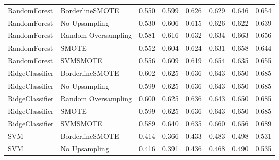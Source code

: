 \begin{tabular}{llllllll}
                RandomForest &     BorderlineSMOTE & 0.550 &                     0.599 &                 0.626 &                  0.629 &                                   0.646 &     0.654 \\
                RandomForest &       No Upsampling & 0.530 &                     0.606 &                 0.615 &                  0.626 &                                   0.622 &     0.639 \\
                RandomForest & Random Oversampling & 0.581 &                     0.616 &                 0.632 &                  0.634 &                                   0.663 &     0.656 \\
                RandomForest &               SMOTE & 0.552 &                     0.604 &                 0.624 &                  0.631 &                                   0.658 &     0.644 \\
                RandomForest &            SVMSMOTE & 0.556 &                     0.609 &                 0.619 &                  0.654 &                                   0.635 &     0.655 \\
             RidgeClassifier &     BorderlineSMOTE & 0.602 &                     0.625 &                 0.636 &                  0.643 &                                   0.650 &     0.685 \\
             RidgeClassifier &       No Upsampling & 0.599 &                     0.625 &                 0.636 &                  0.643 &                                   0.650 &     0.685 \\
             RidgeClassifier & Random Oversampling & 0.600 &                     0.625 &                 0.636 &                  0.643 &                                   0.650 &     0.685 \\
             RidgeClassifier &               SMOTE & 0.599 &                     0.625 &                 0.636 &                  0.643 &                                   0.650 &     0.685 \\
             RidgeClassifier &            SVMSMOTE & 0.589 &                     0.640 &                 0.635 &                  0.660 &                                   0.656 &     0.689 \\
                         SVM &     BorderlineSMOTE & 0.414 &                     0.366 &                 0.433 &                  0.483 &                                   0.498 &     0.531 \\
                         SVM &       No Upsampling & 0.416 &                     0.391 &                 0.436 &                  0.468 &                                   0.490 &     0.535 \\

\end{tabular}
